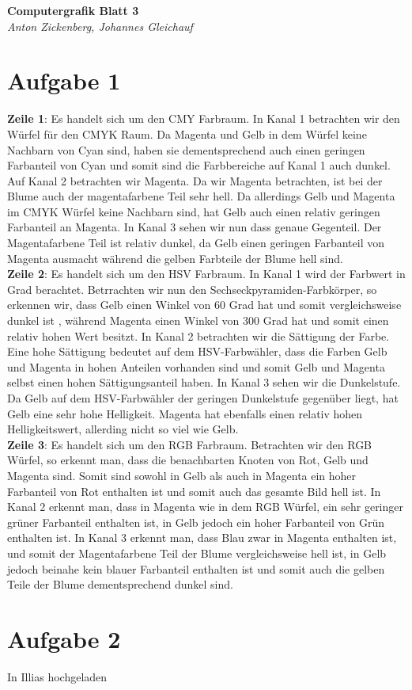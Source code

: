 \documentclass[12pt]{article}
\begin{document}
\begin{center}
 \textbf{\Large Computergrafik Blatt 3}\\
 \emph{Anton Zickenberg, Johannes Gleichauf}
\end{center}

\section*{Aufgabe 1}
\textbf{Zeile 1}: Es handelt sich um den CMY Farbraum. In Kanal 1 betrachten wir den Würfel für den CMYK Raum. Da Magenta und Gelb in dem Würfel keine Nachbarn von Cyan sind, haben sie dementsprechend auch einen geringen Farbanteil von Cyan und somit sind die Farbbereiche auf Kanal 1 auch dunkel. Auf Kanal 2 betrachten wir Magenta. Da wir Magenta betrachten, ist bei der Blume auch der magentafarbene Teil sehr hell. Da allerdings Gelb und Magenta im CMYK Würfel keine Nachbarn sind, hat Gelb auch einen relativ geringen Farbanteil an Magenta. In Kanal 3 sehen wir nun dass genaue Gegenteil. Der Magentafarbene Teil ist relativ dunkel, da Gelb einen geringen Farbanteil von Magenta ausmacht während die gelben Farbteile der Blume hell sind.\\
\textbf{Zeile 2}: Es handelt sich um den HSV Farbraum. In Kanal 1 wird der Farbwert in Grad berachtet. Betrrachten wir nun den Sechseckpyramiden-Farbkörper, so erkennen wir, dass Gelb einen Winkel von 60 Grad hat und somit vergleichsweise dunkel ist , während Magenta einen Winkel von 300 Grad hat und somit einen relativ hohen Wert besitzt. In Kanal 2 betrachten wir die Sättigung der Farbe. Eine hohe Sättigung bedeutet auf dem HSV-Farbwähler, dass die Farben Gelb und Magenta in hohen Anteilen vorhanden sind und somit Gelb und Magenta selbst einen hohen Sättigungsanteil haben. In Kanal 3 sehen wir die Dunkelstufe. Da Gelb auf dem HSV-Farbwähler der geringen Dunkelstufe gegenüber liegt, hat Gelb eine sehr hohe Helligkeit. Magenta hat ebenfalls einen relativ hohen Helligkeitswert, allerding nicht so viel wie Gelb.\\
\textbf{Zeile 3}: Es handelt sich um den RGB Farbraum.  Betrachten wir den RGB Würfel, so erkennt man, dass die benachbarten Knoten von Rot, Gelb und Magenta sind. Somit sind sowohl in Gelb als auch in Magenta ein hoher Farbanteil von Rot enthalten ist und somit auch das gesamte Bild hell ist. In Kanal 2 erkennt man, dass in Magenta wie in dem RGB Würfel, ein sehr geringer grüner Farbanteil enthalten ist, in Gelb jedoch ein hoher Farbanteil von Grün enthalten ist. In Kanal 3 erkennt man, dass Blau zwar in Magenta enthalten ist, und somit der Magentafarbene Teil der Blume vergleichsweise hell ist, in Gelb jedoch beinahe kein blauer Farbanteil enthalten ist und somit auch die gelben Teile der Blume dementsprechend dunkel sind.
\section*{Aufgabe 2}
In Illias hochgeladen
\end{document}
